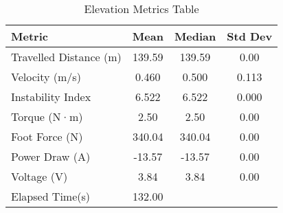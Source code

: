 \documentclass{article}
\begin{document}
\begin{table}[htbp]
\centering
\caption{Elevation Metrics Table}
\label{tab:simulation-metrics}
\begin{tabular}{@{} l S[table-format=3.2] S[table-format=3.2] S[table-format=1.3] @{}}
\toprule
\textbf{Metric} & \textbf{Mean} & \textbf{Median} & \textbf{Std Dev} \\
\midrule
Travelled Distance (m) & 139.59 & 139.59 & 0.00 \\
Velocity (m/s) & 0.460 & 0.500 & 0.113 \\
Instability Index & 6.522 & 6.522 & 0.000 \\
Torque (N·m) & 2.50 & 2.50 & 0.00 \\
Foot Force (N) & 340.04 & 340.04 & 0.00 \\
Power Draw (A) & -13.57 & -13.57 & 0.00 \\
Voltage (V) & 3.84 & 3.84 & 0.00 \\
Elapsed Time(s) & 132.00 \\

\bottomrule
\end{tabular}
\end{table}
\end{document}
